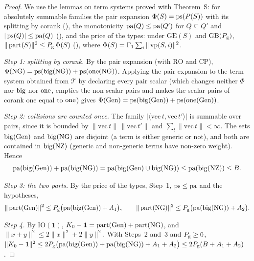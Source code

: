 \begin{proof}
We use the lemmas on term systems proved with Theorem~S: for absolutely summable families the pair expansion
$\Phi(S)=\operatorname{ps}(P(S))$ with its splitting by corank (),
the monotonicity $\operatorname{pa}(Q)\le\operatorname{pa}(Q')$ for $Q\subseteq Q'$ and $|\operatorname{ps}(Q)|\le\operatorname{pa}(Q)$
(), and the price of the types: under
$\mathrm{GE}(S)$ and $\mathrm{GB}(P_{\mathrm g})$, $\|\operatorname{part}(S)\|^2\le P_{\mathrm g}\,\Phi(S)$
(), where $\Phi(S)=\Gamma_1\sum_i\|\operatorname{vp}(S,i)\|^2$.

\emph{Step 1: splitting by corank.} By the pair expansion (with $\mathrm{RO}$ and $\mathrm{CP}$),
$\Phi(\mathrm{NG})=\operatorname{ps}(\operatorname{big}(\mathrm{NG}))+\operatorname{ps}(\operatorname{one}(\mathrm{NG}))$. Applying the pair expansion to
the term system obtained from $\mathcal T$ by declaring every pair scalar (which changes neither $\Phi$ nor $\operatorname{big}$
nor $\operatorname{one}$, empties the non-scalar pairs and makes the scalar pairs of corank one equal to $\operatorname{one}$) gives
$\Phi(\mathrm{Gen})=\operatorname{ps}(\operatorname{big}(\mathrm{Gen}))+\operatorname{ps}(\operatorname{one}(\mathrm{Gen}))$.

\emph{Step 2: collisions are counted once.} The family $|\langle\mathrm{vec}\,t,\mathrm{vec}\,t'\rangle|$ is summable over pairs,
since it is bounded by $\|\mathrm{vec}\,t\|\,\|\mathrm{vec}\,t'\|$ and $\sum_t\|\mathrm{vec}\,t\|<\infty$. The sets
$\operatorname{big}(\mathrm{Gen})$ and $\operatorname{big}(\mathrm{NG})$ are disjoint (a term is either generic or not), and both are contained in
$\operatorname{big}(\mathrm{NZ})$ (generic and non-generic terms have non-zero weight). Hence
\[
\operatorname{pa}(\operatorname{big}(\mathrm{Gen}))+\operatorname{pa}(\operatorname{big}(\mathrm{NG}))
=\operatorname{pa}(\operatorname{big}(\mathrm{Gen})\cup\operatorname{big}(\mathrm{NG}))\le\operatorname{pa}(\operatorname{big}(\mathrm{NZ}))\le B .
\]

\emph{Step 3: the two parts.} By the price of the types, Step~1, $\operatorname{ps}\le\operatorname{pa}$ and the hypotheses,
\[
\|\operatorname{part}(\mathrm{Gen})\|^2\le P_{\mathrm g}\bigl(\operatorname{pa}(\operatorname{big}(\mathrm{Gen}))+A_1\bigr),\qquad
\|\operatorname{part}(\mathrm{NG})\|^2\le P_{\mathrm g}\bigl(\operatorname{pa}(\operatorname{big}(\mathrm{NG}))+A_2\bigr).
\]

\emph{Step 4.} By $\mathrm{IO}(\mathbf 1)$, $K_0-\mathbf 1=\operatorname{part}(\mathrm{Gen})+\operatorname{part}(\mathrm{NG})$, and
$\|x+y\|^2\le2\|x\|^2+2\|y\|^2$. With Steps~2 and~3 and $P_{\mathrm g}\ge0$,
$\|K_0-\mathbf 1\|^2\le2P_{\mathrm g}\bigl(\operatorname{pa}(\operatorname{big}(\mathrm{Gen}))+\operatorname{pa}(\operatorname{big}(\mathrm{NG}))+A_1+A_2\bigr)
\le2P_{\mathrm g}(B+A_1+A_2)$.
\end{proof}

